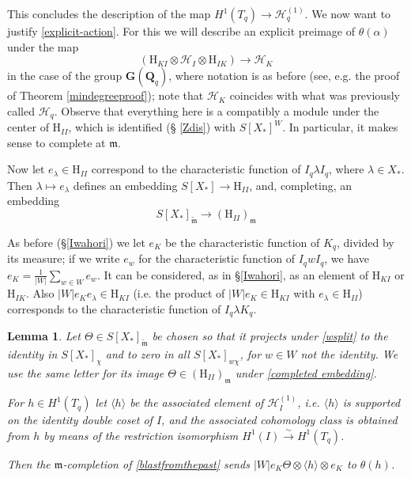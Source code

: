 \documentclass[10pt]{amsart}
\newcommand{\changecolor}{black}
\newcommand{\Q}{\mathbf{Q}}
\newcommand{\G}{\mathbf{G}}
\newtheorem{lemma}[subsection]{Lemma}
\theoremstyle{remark}
\begin{document}
This concludes the description of the map $H^1(T_q) \rightarrow \mathscr{H}_q^{(1)}$.  We now want    to justify \eqref{explicit-action}.     For this
we will describe an explicit preimage of $\theta(\alpha)$ under the map  
\begin{equation} \label{blastfromthepast} \left( \mathrm{H}_{KI}  \otimes \mathscr{H}_I  \otimes \mathrm{H}_{IK} \right)  \rightarrow   \mathscr{H}_K \end{equation}
in the case of the group $\G(\Q_q)$, where notation is as before (see, e.g. the proof of Theorem \ref{mindegreeproof});
note that $\mathscr{H}_K$ coincides
with what was previously called $\mathscr{H}_q$. 
Observe that everything here is a compatibly a module under the center of $\mathrm{H}_{II}$,   which 
is identified (\S 
\ref{Zdis})
with $S[X_*]^W$. In particular, it makes sense to complete at $\mathfrak{m}$. 


Now let $e_{\lambda} \in \mathrm{H}_{II}$ correspond to the characteristic function of $I_q \lambda  I_q$, where $\lambda \in X_*$.
Then $\lambda \mapsto e_{\lambda}$ defines an embedding $S[X_*] \rightarrow \mathrm{H}_{II}$, and, completing,
an embedding
\begin{equation} \label{completed embedding} S[X_*]_{\widetilde{\mathfrak{m}}} \rightarrow (\mathrm{H}_{II})_{\mathfrak{m}} \end{equation}

As before (\S \ref{Iwahori}) we let $e_K$ be   the characteristic function of $K_q$, divided by its measure; 
if we write $e_w$ for the characteristic function of $I_q w I_q$, we have $e_K = \frac{1}{|W|} \sum_{w \in W} e_w$. 
It can be considered, as in \S \ref{Iwahori}, as an element of $\mathrm{H}_{KI}$ or $\mathrm{H}_{IK}$. 
%
Also $|W|   e_K e_{\lambda}   \in \mathrm{H}_{KI}$ 
{\color{\changecolor} (i.e.  the product of $|W| e_K \in \mathrm{H}_{KI}$ with $e_{\lambda} \in \mathrm{H}_{II}$)} corresponds to the characteristic function of $I_q \lambda K_q$.  

\begin{lemma} \label{Theta explicit}
 Let $\Theta  \in  S[X_*]_{\widetilde{\mathfrak{m}}}$
 be chosen so that it projects under \eqref{wsplit} to the identity in $S[X_*]_{\chi}$
 and to zero in all $S[X_*]_{w \chi}$, for $w \in W$ not the identity.  
We use the same letter for its image $\Theta \in  (\mathrm{H}_{II})_{\mathfrak{m}}$
 under \eqref{completed embedding}. 
 
 
For $h \in H^1(T_q)$ let $\langle h \rangle$ be the associated element of $\mathscr{H}_{I}^{(1)}$, i.e.
$\langle h \rangle$ is supported on the identity double coset of $I$, and 
the associated cohomology class is obtained from $h$ by means of the restriction isomorphism
$H^1(I) \stackrel{\sim}{\rightarrow} H^1(T_q)$. 

  
Then the $\mathfrak{m}$-completion of
 \eqref{blastfromthepast} sends  $|W|  e_K \Theta \otimes \langle h  \rangle \otimes  e_K$  to $\theta(h)$.
  \end{lemma}
  
\end{document}
